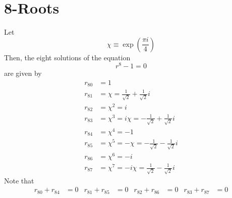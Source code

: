 \section{8-Roots}
Let
\begin{equation}
    \chi \equiv \exp\left( \frac{\pi i}{4} \right)
\end{equation}
Then, the eight solutions of the equation
\begin{equation}
    r^{8} - 1 = 0
\end{equation}
are given by
\begin{align}
    r_{80} &= 1 \\
    r_{81} &= \chi = \frac{1}{\sqrt{2}} + \frac{1}{\sqrt{2}}i \\
    r_{82} &= \chi^{2} = i \\
    r_{83} &= \chi^{3} = i \chi = -\frac{1}{\sqrt{2}} + \frac{1}{\sqrt{2}}i \\
    r_{84} &= \chi^{4} = -1 \\
    r_{85} &= \chi^{5} = -\chi = -\frac{1}{\sqrt{2}} - \frac{1}{\sqrt{2}}i \\
    r_{86} &= \chi^{6} = -i \\
    r_{87} &= \chi^{7} = -i \chi = \frac{1}{\sqrt{2}} - \frac{1}{\sqrt{2}}i
\end{align}
Note that
\begin{align}
    r_{80} + r_{84} &= 0 & r_{81} + r_{85} &= 0 & r_{82} + r_{86} &= 0 & r_{83} + r_{87} &= 0
\end{align}
